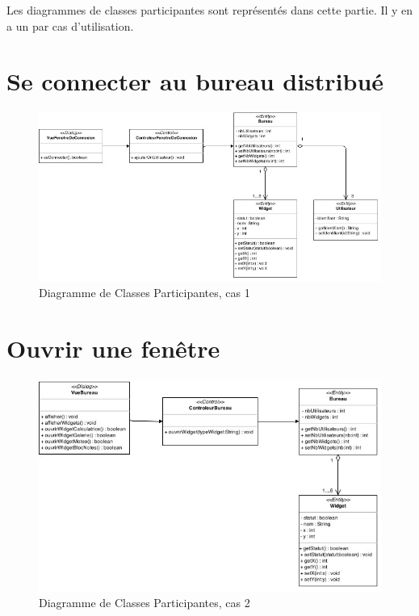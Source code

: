 Les diagrammes de classes participantes sont représentés dans cette 
partie. Il y en a un par cas d'utilisation.

\section{Se connecter au bureau distribué}

\noindent\begin{figure}[H]
	\centering
	\includegraphics[angle=90,scale=0.8]{diagrammes/DCP1.jpg}
	\caption{Diagramme de Classes Participantes, cas 1}
\end{figure}

\section{Ouvrir une fenêtre}

\begin{figure}[H]
	\centering
	\includegraphics[angle=90]{diagrammes/DCP2.jpg}
	\caption{Diagramme de Classes Participantes, cas 2}
\end{figure}

